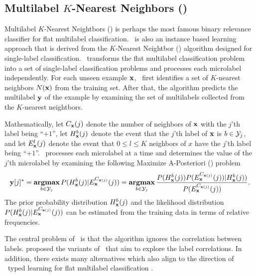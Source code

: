 {%
%
\subsection{Multilabel $K$-Nearest Neighbors (\mlknn)} \label{sc_mlknn}

Multilabel $K$-Nearest Neightbors (\mlknn) \citep{Zhang05a,Zhang07mlknn} is perhaps the most famous binary relevance classifier for flat multilabel classification.
\mlknn\ is also an instance based learning approach \citep{Aha91instance} that is derived from the $K$-Nearest Neightbor (\knn) algorithm designed for single-label classification.
\mlknn\ transforms the flat multilabel classification problem into a set of single-label classification problems and processes each microlabel independently.
For each unseen example $\mathbf {x}$, \mlknn\ first identifies a set of $K$-nearest neighbors $N(\mathbf {x})$ from the training set.
After that, the algorithm predicts the multilabel $\mathbf {y}$ of the example by examining the set of multilabels collected from the $K$-nearest neightbors.

Mathematically,
let $C_{\mathbf {x}}(j)$ denote the number of neighbors of $\mathbf {x}$ with the $j$'th label being ``$+1$'',
let $H^b_{\mathbf {x}}(j)$ denote the event that the $j$'th label of $\mathbf {x}$ is $b\in\mathcal{Y}_j$,
and let $E_{\mathbf {x}}^l(j)$ denote the event that $0\le l \le K$ neighbors of $x$ have the $j$'th label being ``$+1$''.
\mlknn\ processes each microlabel at a time and determines the value of the $j$'th microlabel by examining the following Maximize A-Posteriori (\map) problem
\begin{align*}
	\mathbf {y}[j]^* = \underset{b\in\mathcal{Y}_j}{\textbf{argmax}} \, P( H^b_{\mathbf {x}}(j) | E_{\mathbf {x}}^{C_{\mathbf {x}(j)}}(j) )
	= \underset{b\in\mathcal{Y}_j}{\textbf{argmax}} \, \frac{P( H^b_{\mathbf {x}}(j) ) P(  E_{\mathbf {x}}^{C_{\mathbf {x}(j)}}(j) ) | H^b_{\mathbf {x}}(j))}{P( E_{\mathbf {x}}^{C_{\mathbf {x}(j)}}(j))}.
\end{align*}
The prior probability distribution $H^b_{\mathbf {x}}(j)$ and the likelihood distribution $P( H^b_{\mathbf {x}}(j) | E_{\mathbf {x}}^{C_{\mathbf {x}(j)}}(j) )$ can be estimated from the training data in terms of relative frequencies.

The central problem of \mlknn\ is that the algorithm ignores the correlation between labels.
\citet{Cheng09combining,Younes11a} proposed the variants of \mlknn\ that aim to explore the label correlations.
In addition, there exists many alternatives which also align to the direction of \knn\ typed learning for flat multilabel classification \citep{Brinker07case,Chiang12a}.



%
%
}
